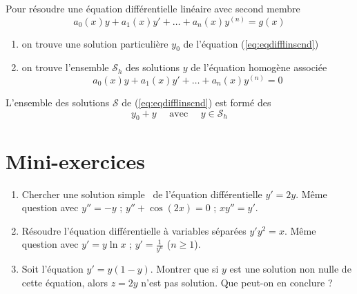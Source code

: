\begin{frame}

Pour résoudre une équation différentielle linéaire avec second membre 
\begin{equation}
  a_0(x)y+a_1(x)y'+\dots +a_n(x)y^{(n)} = g(x)
  \label{eq:eqdifflinscnd}
 \tag{$E$}
\end{equation}

\pause
\begin{enumerate}
  \item on trouve une solution particulière $y_0$ de l'équation (\ref{eq:eqdifflinscnd})
  \pause
  \item on trouve l'ensemble $\mathcal{S}_h$ des solutions $y$ de l'équation homogène associée
\begin{equation}
  a_0(x)y+a_1(x)y'+\dots +a_n(x)y^{(n)} = 0
  \label{eq:eqdifflin}
 \tag{$E_0$}
\end{equation}  
\end{enumerate}

\pause

\begin{proposition}
L'ensemble des solutions $\mathcal{S}$ de (\ref{eq:eqdifflinscnd}) est formé 
des 
$$y_0 + y \quad \text{ avec } \quad  y \in \mathcal{S}_h$$
\end{proposition}

\end{frame}





 \section*{Mini-exercices}

\begin{frame}
\begin{miniexercice}
\begin{enumerate}
  \item Chercher une solution \og simple \fg\ de l'équation différentielle
  $y'=2y$. Même question avec $y''=-y$ ; $y''+\cos(2x)=0$ ; $xy''=y'$.
  
  \item Résoudre l'équation différentielle à variables séparées $y'y^2=x$.
  Même question avec $y'= y \ln x$ ; $y' = \frac{1}{y^n}$ ($n\ge1$).
  
  \item Soit l'équation $y' = y(1 - y)$. Montrer que si 
  $y$ est une solution non nulle de cette équation, alors $z = 2y$
  n'est pas solution. Que peut-on en conclure ?

\end{enumerate}
\end{miniexercice}
\end{frame}





